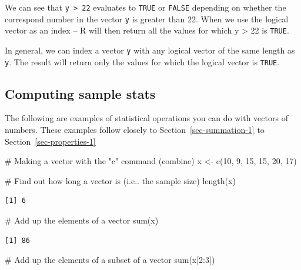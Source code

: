 \documentclass[
  letterpaper,
  DIV=11,
  numbers=noendperiod]{scrreprt}
\newenvironment{Shaded}{\begin{snugshade}}{\end{snugshade}}
\newcommand{\CommentTok}[1]{\textcolor[rgb]{0.37,0.37,0.37}{#1}}
\newcommand{\DecValTok}[1]{\textcolor[rgb]{0.68,0.00,0.00}{#1}}
\newcommand{\FunctionTok}[1]{\textcolor[rgb]{0.28,0.35,0.67}{#1}}
\newcommand{\NormalTok}[1]{\textcolor[rgb]{0.00,0.23,0.31}{#1}}
\newcommand{\OtherTok}[1]{\textcolor[rgb]{0.00,0.23,0.31}{#1}}
\newcommand{\SpecialCharTok}[1]{\textcolor[rgb]{0.37,0.37,0.37}{#1}}
\begin{document}
We can see that \texttt{y\ \textgreater{}\ 22} evaluates to
\texttt{TRUE} or \texttt{FALSE} depending on whether the correspond
number in the vector \texttt{y} is greater than 22. When we use the
logical vector as an index -- R will then return all the values for
which y \textgreater{} 22 is \texttt{TRUE}.

In general, we can index a vector \texttt{y} with any logical vector of
the same length as \texttt{y}. The result will return only the values
for which the logical vector is \texttt{TRUE}.

\hypertarget{sec-computing-stats-1}{%
\subsection{Computing sample stats}\label{sec-computing-stats-1}}

The following are examples of statistical operations you can do with
vectors of numbers. These examples follow closely to
Section~\ref{sec-summation-1} to Section~\ref{sec-properties-1}

\begin{Shaded}
\begin{Highlighting}[]
\CommentTok{\# Making a vector with the "c" command (combine) }
\NormalTok{x }\OtherTok{\textless{}{-}} \FunctionTok{c}\NormalTok{(}\DecValTok{10}\NormalTok{, }\DecValTok{9}\NormalTok{, }\DecValTok{15}\NormalTok{, }\DecValTok{15}\NormalTok{, }\DecValTok{20}\NormalTok{, }\DecValTok{17}\NormalTok{)}

\CommentTok{\# Find out how long a vector is (i.e.. the sample size)}
\FunctionTok{length}\NormalTok{(x)}
\end{Highlighting}
\end{Shaded}

\begin{verbatim}
[1] 6
\end{verbatim}

\begin{Shaded}
\begin{Highlighting}[]
\CommentTok{\# Add up the elements of a vector}
\FunctionTok{sum}\NormalTok{(x)}
\end{Highlighting}
\end{Shaded}

\begin{verbatim}
[1] 86
\end{verbatim}

\begin{Shaded}
\begin{Highlighting}[]
\CommentTok{\# Add up the elements of a subset of a vector}
\FunctionTok{sum}\NormalTok{(x[}\DecValTok{2}\SpecialCharTok{:}\DecValTok{3}\NormalTok{])}
\end{Highlighting}
\end{Shaded}
\end{document}
